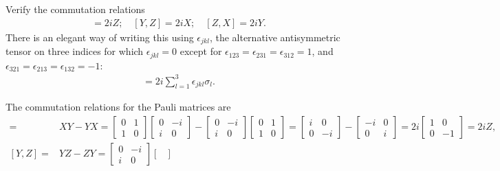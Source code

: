 \documentclass[en]{sol-man}
\begin{document}
\begin{exe}
    Verify the commutation relations
    \begin{align}
        [X,Y]=2iZ;\quad[Y,Z]=2iX;\quad[Z,X]=2iY.
    \end{align}
    There is an elegant way of writing this using $\epsilon_{jkl}$, the alternative antisymmetric tensor on three indices for which $\epsilon_{jkl}=0$ except for $\epsilon_{123}=\epsilon_{231}=\epsilon_{312}=1$, and $\epsilon_{321}=\epsilon_{213}=\epsilon_{132}=-1$:
    \begin{align}
        [\sigma_j,\sigma_k]=2i\sum_{l=1}^3\epsilon_{jkl}\sigma_l.
    \end{align}
\end{exe}
\begin{pf}
    The commutation relations for the Pauli matrices are
    \begin{align}
        [X,Y]=&XY-YX=\begin{bmatrix}
            0&1\\
            1&0
        \end{bmatrix}\begin{bmatrix}
            0&-i\\
            i&0
        \end{bmatrix}-\begin{bmatrix}
            0&-i\\
            i&0
        \end{bmatrix}\begin{bmatrix}
            0&1\\
            1&0
        \end{bmatrix}=\begin{bmatrix}
            i&0\\
            0&-i
        \end{bmatrix}-\begin{bmatrix}
            -i&0\\
            0&i
        \end{bmatrix}=2i\begin{bmatrix}
            1&0\\
            0&-1
        \end{bmatrix}=2iZ,\\
        [Y,Z]=&YZ-ZY=\begin{bmatrix}
            0&-i\\
            i&0
        \end{bmatrix}\begin{bmatrix}

\end{bmatrix}
\end{align}
\end{pf}
\end{document}
